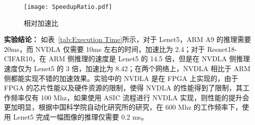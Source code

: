 \begin{figure}[!htbp]
    \centering
    \texttt{[image: SpeedupRatio.pdf]}
    \caption{相对加速比}
    \label{fig:Relative Speedup}
\end{figure}

\textbf{实验结论：} 如表~\ref{tab:Execution Time}所示，对于 Lenet5，ARM A9 的推理需要 20ms，而 NVDLA 仅需要 10ms 左右的时间，加速比为 2.4；对于 Resnet18-CIFAR10，在 ARM 侧推理的速度是 Lenet5 的 14.5 倍，但是在 NVDLA 侧推理速度仅为 Lenet5 的 3 倍，加速比为 8.42；在两个网络上，NVDLA 相比于 ARM 侧都能实现不错的加速效果。实验中的 NVDLA 是在 FPGA 上实现的，由于 FPGA 的芯片性能以及硬件资源的限制，使得 NVDLA 的性能得到了限制，其工作频率仅有 100 Mhz，如果使用 ASIC 流程进行 NVDLA 实现，则性能的提升会更加明显，根据中国科学院自动化研究所的研究，在 600 Mhz 的工作频率下，使用 Lenet5 完成一幅图像的推理仅需要 0.2 ms\cite{9040769}。 
